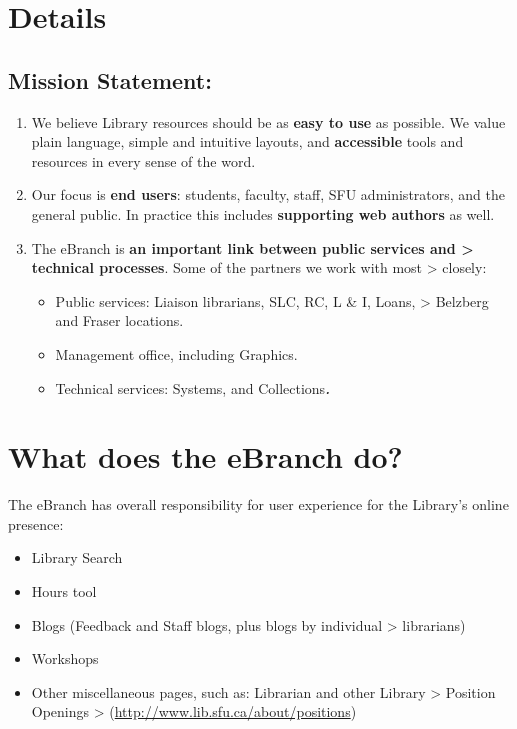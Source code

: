 \documentclass[
  openany]{book}
\begin{document}
\hypertarget{details}{%
\chapter{Details}\label{details}}

\hypertarget{mission-statement}{%
\section{Mission Statement:}\label{mission-statement}}

\begin{enumerate}
\def\labelenumi{\Alph{enumi}.}
\item
  We believe Library resources should be as \textbf{easy to use} as possible. We value plain language, simple and intuitive layouts, and \textbf{accessible} tools and resources in every sense of the word.
\item
  Our focus is \textbf{end users}: students, faculty, staff, SFU administrators, and the general public. In practice this includes \textbf{supporting web authors} as well.
\item
  The eBranch is \textbf{an important link between public services and
  \textgreater{} technical processes}. Some of the partners we work with most
  \textgreater{} closely:

  \begin{itemize}
  \item
    Public services: Liaison librarians, SLC, RC, L \& I, Loans,
    \textgreater{} Belzberg and Fraser locations.
  \item
    Management office, including Graphics.
  \item
    Technical services: Systems, and Collections\textbf{\emph{.}}
  \end{itemize}
\end{enumerate}

\hypertarget{what-does-the-ebranch-do}{%
\chapter{What does the eBranch do?}\label{what-does-the-ebranch-do}}

The eBranch has overall responsibility for user experience for the
Library's online presence:

\begin{itemize}
\item
  Library Search
\item
  Hours tool
\item
  Blogs (Feedback and Staff blogs, plus blogs by individual
  \textgreater{} librarians)
\item
  Workshops
\item
  Other miscellaneous pages, such as: Librarian and other Library
  \textgreater{} Position Openings
  \textgreater{} (\href{http://www.lib.sfu.ca/about/positions}{{http://www.lib.sfu.ca/about/positions}})
\end{itemize}
\end{document}
